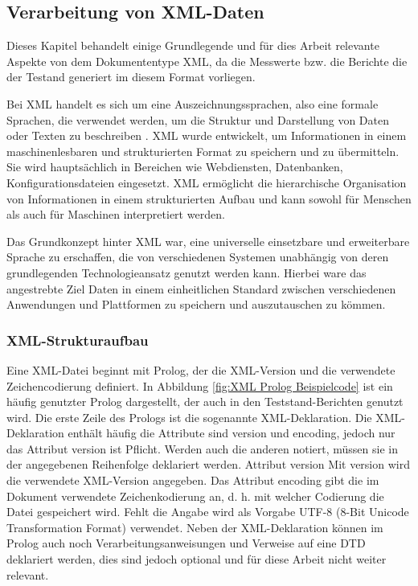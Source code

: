 \subsection{Verarbeitung von XML-Daten}
\label{subsec:verarbeitung-von-xml-daten}
Dieses Kapitel behandelt einige Grundlegende und für dies Arbeit relevante Aspekte von dem Dokumententype \ac{XML},
da die Messwerte bzw. die Berichte die der Testand generiert im diesem Format vorliegen.


Bei \ac{XML} handelt es sich um eine Auszeichnungssprachen, also eine
formale Sprachen, die verwendet werden, um die Struktur und Darstellung von Daten oder Texten zu beschreiben \cite*{Neumann2019}.
\ac{XML} wurde entwickelt, um Informationen in einem maschinenlesbaren und strukturierten Format zu speichern und zu übermitteln.
Sie wird hauptsächlich in Bereichen wie Webdiensten, Datenbanken, Konfigurationsdateien eingesetzt.
\ac{XML} ermöglicht die hierarchische Organisation von Informationen in einem strukturierten Aufbau und kann sowohl für Menschen
als auch für Maschinen interpretiert werden.\cite*{PeterBrezany2003}

Das Grundkonzept hinter \ac{XML} war, eine universelle einsetzbare und erweiterbare Sprache zu erschaffen, die von verschiedenen Systemen
unabhängig von deren grundlegenden Technologieansatz genutzt werden kann.
Hierbei ware das angestrebte Ziel Daten in einem einheitlichen Standard zwischen verschiedenen Anwendungen und Plattformen zu speichern und auszutauschen
zu kömmen.\cite*{PeterBrezany2003}
\subsubsection{XML-Strukturaufbau}
Eine \ac{XML}-Datei beginnt mit Prolog, der die \ac{XML}-Version und die verwendete Zeichencodierung definiert.
In Abbildung \ref{fig:XML Prolog Beispielcode} ist ein häufig genutzter Prolog dargestellt, der auch in den Teststand-Berichten genutzt wird.
Die erste Zeile des Prologs ist die sogenannte XML-Deklaration.
Die XML-Deklaration enthält häufig die Attribute sind version und encoding, jedoch nur das Attribut version ist Pflicht.
Werden auch die anderen notiert, müssen sie in der angegebenen Reihenfolge deklariert werden.
Attribut version Mit version wird die verwendete XML-Version angegeben.
Das Attribut encoding gibt die im Dokument verwendete Zeichenkodierung an, d. h. mit welcher Codierung die Datei gespeichert wird.
Fehlt die Angabe wird als Vorgabe UTF-8 (8-Bit Unicode Transformation Format) verwendet.
Neben der \ac{XML}-Deklaration können im Prolog auch noch Verarbeitungsanweisungen und Verweise auf eine \ac{DTD} deklariert werden,
dies sind jedoch optional und für diese Arbeit nicht weiter relevant.
\cite*[8,9]{Becher2022}

